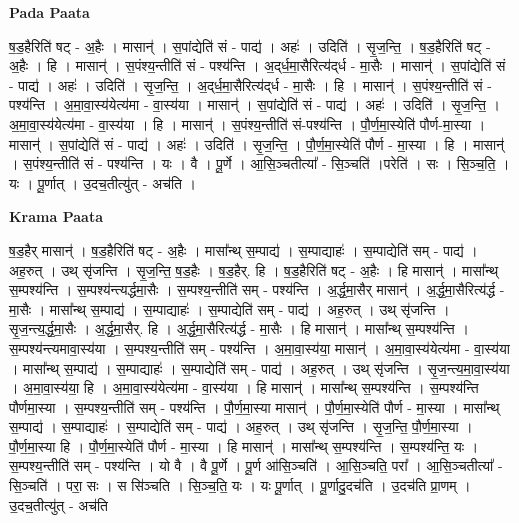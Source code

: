 \documentclass[17pt]{extarticle}
\begin{document}
\textbf{Pada Paata} \newline

ष॒ड॒हैरिति॑ षट् - अ॒हैः । मासान्॑ । स॒पांद्येति॑ सं - पाद्य॑ । अहः॑ । उदिति॑ । सृ॒ज॒न्ति॒ । ष॒ड॒हैरिति॑ षट् - अ॒हैः । हि । मासान्॑ । स॒पंश्य॒न्तीति॑ सं - पश्य॑न्ति । अ॒द्‌र्ध॒मा॒सैरित्य॑द्‌र्ध - मा॒सैः । मासान्॑ । स॒पांद्येति॑ सं - पाद्य॑ । अहः॑ । उदिति॑ । सृ॒ज॒न्ति॒ । अ॒द्‌र्ध॒मा॒सैरित्य॑द्‌र्ध - मा॒सैः । हि । मासान्॑ । स॒पंश्य॒न्तीति॑ सं - पश्य॑न्ति । अ॒मा॒वा॒स्य॑येत्य॑मा - वा॒स्य॑या । मासान्॑ । स॒पांद्येति॑ सं - पाद्य॑ । अहः॑ । उदिति॑ । सृ॒ज॒न्ति॒ । अ॒मा॒वा॒स्य॑येत्य॑मा - वा॒स्य॑या । हि । मासान्॑ । स॒पंश्य॒न्तीति॑ सं-पश्य॑न्ति । पौ॒र्ण॒मा॒स्येति॑ पौर्ण-मा॒स्या । मासान्॑ । स॒पांद्येति॑ सं - पाद्य॑ । अहः॑ । उदिति॑ । सृ॒ज॒न्ति॒ । पौ॒र्ण॒मा॒स्येति॑ पौर्ण - मा॒स्या । हि । मासान्॑ । स॒पंश्य॒न्तीति॑ सं - पश्य॑न्ति । यः । वै । पू॒र्णे । आ॒सि॒ञ्चतीत्या᳚ - सि॒ञ्चति॑ ।परेति॑ । सः । सि॒ञ्च॒ति॒ । यः । पू॒र्णात् । उ॒दच॒तीत्यु॑त् - अच॑ति ।  \newline


\textbf{Krama Paata} \newline

ष॒ड॒हैर् मासान्॑ । ष॒ड॒हैरिति॑ षट् - अ॒हैः । मासा᳚न्थ् स॒म्पाद्य॑ । स॒म्पाद्याहः॑ । स॒म्पाद्येति॑ सम् - पाद्य॑ । अह॒रुत् । उथ् सृ॑जन्ति । सृ॒ज॒न्ति॒ ष॒ड॒हैः । ष॒ड॒हैर्. हि । ष॒ड॒हैरिति॑ षट् - अ॒हैः । हि मासान्॑ । मासा᳚न्थ् स॒म्पश्य॑न्ति । स॒म्पश्य॑न्त्यर्द्धमा॒सैः । स॒म्पश्य॒न्तीति॑ सम् - पश्य॑न्ति । अ॒र्द्ध॒मा॒सैर् मासान्॑ । अ॒र्द्ध॒मा॒सैरित्य॑र्द्ध - मा॒सैः । मासा᳚न्थ् स॒म्पाद्य॑ । स॒म्पाद्याहः॑ । स॒म्पाद्येति॑ सम् - पाद्य॑ । अह॒रुत् । उथ् सृ॑जन्ति । सृ॒ज॒न्त्य॒र्द्ध॒मा॒सैः । अ॒र्द्ध॒मा॒सैर्. हि । अ॒र्द्ध॒मा॒सैरित्य॑र्द्ध - मा॒सैः । हि मासान्॑ । मासा᳚न्थ् स॒म्पश्य॑न्ति । स॒म्पश्य॑न्त्यमावा॒स्य॑या । स॒म्पश्य॒न्तीति॑ सम् - पश्य॑न्ति । अ॒मा॒वा॒स्य॑या॒ मासान्॑ । अ॒मा॒वा॒स्य॑येत्य॑मा - वा॒स्य॑या । मासा᳚न्थ् स॒म्पाद्य॑ । स॒म्पाद्याहः॑ । स॒म्पाद्येति॑ सम् - पाद्य॑ । अह॒रुत् । उथ् सृ॑जन्ति । सृ॒ज॒न्त्य॒मा॒वा॒स्य॑या । अ॒मा॒वा॒स्य॑या॒ हि । अ॒मा॒वा॒स्य॑येत्य॑मा - वा॒स्य॑या । हि मासान्॑ । मासा᳚न्थ् स॒म्पश्य॑न्ति । स॒म्पश्य॑न्ति पौर्णमा॒स्या । स॒म्पश्य॒न्तीति॑ सम् - पश्य॑न्ति । पौ॒र्ण॒मा॒स्या मासान्॑ । पौ॒र्ण॒मा॒स्येति॑ पौर्ण - मा॒स्या । मासा᳚न्थ् स॒म्पाद्य॑ । स॒म्पाद्याहः॑ । स॒म्पाद्येति॑ सम् - पाद्य॑ । अह॒रुत् । उथ् सृ॑जन्ति । सृ॒ज॒न्ति॒ पौ॒र्ण॒मा॒स्या । पौ॒र्ण॒मा॒स्या हि । पौ॒र्ण॒मा॒स्येति॑ पौर्ण - मा॒स्या । हि मासान्॑ । मासा᳚न्थ् स॒म्पश्य॑न्ति । स॒म्पश्य॑न्ति॒ यः । स॒म्पश्य॒न्तीति॑ सम् - पश्य॑न्ति । यो वै । वै पू॒र्णे । पू॒र्ण आ॑सि॒ञ्चति॑ । आ॒सि॒ञ्चति॒ परा᳚ । आ॒सि॒ञ्चतीत्या᳚ - सि॒ञ्चति॑ । परा॒ सः । स सि॑ञ्चति । सि॒ञ्च॒ति॒ यः । यः पू॒र्णात् । पू॒र्णादु॒दच॑ति । उ॒दच॑ति प्रा॒णम् । उ॒दच॒तीत्यु॑त् - अच॑ति \newline
\end{document}
